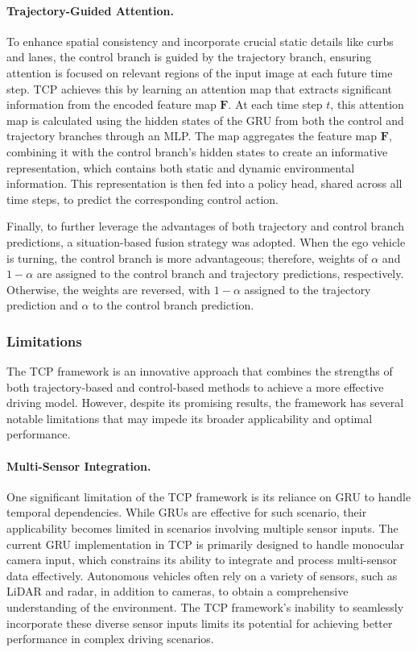 \paragraph{Trajectory-Guided Attention.} To enhance spatial consistency and incorporate crucial static details like curbs and lanes, the control branch is guided by the trajectory branch, ensuring attention is focused on relevant regions of the input image at each future time step. TCP achieves this by learning an attention map that extracts significant information from the encoded feature map $\textbf{F}$. At each time step $t$, this attention map is calculated using the hidden states of the GRU from both the control and trajectory branches through an MLP. The map aggregates the feature map \(\textbf{F}\), combining it with the control branch's hidden states to create an informative representation, which contains both static and dynamic environmental information. This representation is then fed into a policy head, shared across all time steps, to predict the corresponding control action.

Finally, to further leverage the advantages of both trajectory and control branch predictions, a situation-based fusion strategy was adopted. When the ego vehicle is turning, the control branch is more advantageous; therefore, weights of \(\alpha\) and \(1-\alpha\) are assigned to the control branch and trajectory predictions, respectively. Otherwise, the weights are reversed, with \(1-\alpha\) assigned to the trajectory prediction and \(\alpha\) to the control branch prediction.

\subsubsection{Limitations}
The TCP framework is an innovative approach that combines the strengths of both trajectory-based and control-based methods to achieve a more effective driving model. However, despite its promising results, the framework has several notable limitations that may impede its broader applicability and optimal performance.

\paragraph{Multi-Sensor Integration.} One significant limitation of the TCP framework is its reliance on GRU to handle temporal dependencies. While GRUs are effective for such scenario, their applicability becomes limited in scenarios involving multiple sensor inputs. The current GRU implementation in TCP is primarily designed to handle monocular camera input, which constrains its ability to integrate and process multi-sensor data effectively. Autonomous vehicles often rely on a variety of sensors, such as LiDAR and radar, in addition to cameras, to obtain a comprehensive understanding of the environment. The TCP framework's inability to seamlessly incorporate these diverse sensor inputs limits its potential for achieving better performance in complex driving scenarios.

